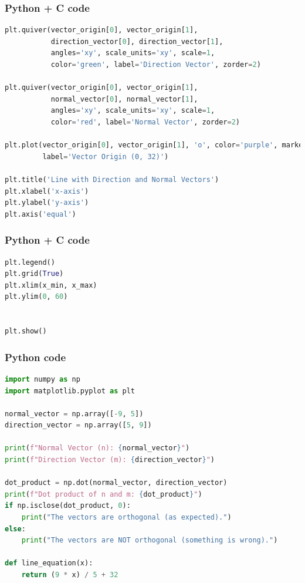 \documentclass{beamer}
\begin{document}
\begin{frame}[fragile]
    \frametitle{Python + C code}

    \begin{lstlisting}[language=Python]
plt.quiver(vector_origin[0], vector_origin[1],
           direction_vector[0], direction_vector[1],
           angles='xy', scale_units='xy', scale=1,
           color='green', label='Direction Vector', zorder=2)

plt.quiver(vector_origin[0], vector_origin[1],
           normal_vector[0], normal_vector[1],
           angles='xy', scale_units='xy', scale=1,
           color='red', label='Normal Vector', zorder=2)
           
plt.plot(vector_origin[0], vector_origin[1], 'o', color='purple', markersize=8,
         label='Vector Origin (0, 32)')

plt.title('Line with Direction and Normal Vectors')
plt.xlabel('x-axis')
plt.ylabel('y-axis')
plt.axis('equal')
    \end{lstlisting}
\end{frame}
\begin{frame}[fragile]
    \frametitle{Python + C code}

    \begin{lstlisting}[language=Python]
plt.legend()
plt.grid(True)
plt.xlim(x_min, x_max)
plt.ylim(0, 60)


plt.show()
      \end{lstlisting}
\end{frame}
\begin{frame}[fragile]
    \frametitle{Python code}

    \begin{lstlisting}[language=Python]
import numpy as np
import matplotlib.pyplot as plt

normal_vector = np.array([-9, 5])
direction_vector = np.array([5, 9])

print(f"Normal Vector (n): {normal_vector}")
print(f"Direction Vector (m): {direction_vector}")

dot_product = np.dot(normal_vector, direction_vector)
print(f"Dot product of n and m: {dot_product}")
if np.isclose(dot_product, 0):
    print("The vectors are orthogonal (as expected).")
else:
    print("The vectors are NOT orthogonal (something is wrong).")

def line_equation(x):
    return (9 * x) / 5 + 32

    \end{lstlisting}
\end{frame}
\end{document}
